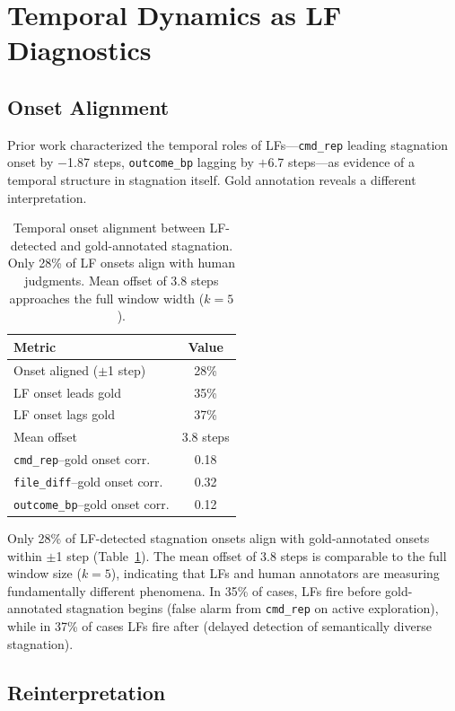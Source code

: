\documentclass[11pt]{article}
\begin{document}
\section{Temporal Dynamics as LF Diagnostics}
\label{sec:temporal}

\subsection{Onset Alignment}

Prior work characterized the temporal roles of LFs---\texttt{cmd\_rep} leading stagnation onset by $-$1.87 steps, \texttt{outcome\_bp} lagging by $+$6.7 steps---as evidence of a temporal structure in stagnation itself. Gold annotation reveals a different interpretation.

\begin{table}[t]
\centering
\small
\begin{tabular}{lc}
\toprule
\textbf{Metric} & \textbf{Value} \\
\midrule
Onset aligned ($\pm$1 step) & 28\% \\
LF onset leads gold & 35\% \\
LF onset lags gold  & 37\% \\
Mean offset          & 3.8 steps \\
\texttt{cmd\_rep}--gold onset corr.   & 0.18 \\
\texttt{file\_diff}--gold onset corr. & 0.32 \\
\texttt{outcome\_bp}--gold onset corr. & 0.12 \\
\bottomrule
\end{tabular}
\caption{Temporal onset alignment between LF-detected and gold-annotated stagnation. Only 28\% of LF onsets align with human judgments. Mean offset of 3.8 steps approaches the full window width ($k{=}5$).}
\label{tab:onset}
\end{table}

Only 28\% of LF-detected stagnation onsets align with gold-annotated onsets within $\pm$1 step (Table~\ref{tab:onset}). The mean offset of 3.8 steps is comparable to the full window size ($k{=}5$), indicating that LFs and human annotators are measuring fundamentally different phenomena. In 35\% of cases, LFs fire before gold-annotated stagnation begins (false alarm from \texttt{cmd\_rep} on active exploration), while in 37\% of cases LFs fire after (delayed detection of semantically diverse stagnation).

\subsection{Reinterpretation}
\end{document}
